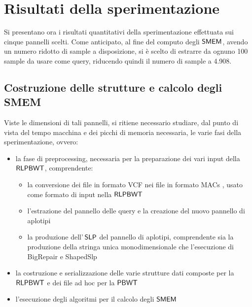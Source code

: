 \section{Risultati della sperimentazione}
Si presentano ora i risultati quantitativi della sperimentazione effettuata sui
cinque pannelli scelti. Come anticipato, al fine del computo degli $\mbox{\rm {\sf SMEM}}$,
avendo un numero 
ridotto di sample a disposizione, si è scelto di estrarre da ognuno 100 sample
da usare come query, riducendo quindi il numero di sample a 4.908.
\subsection{Costruzione delle strutture e calcolo degli SMEM}
Viste le dimensioni di tali pannelli, si ritiene necessario studiare, dal punto
di vista del tempo macchina e dei picchi di memoria necessaria, le varie fasi
della sperimentazione, ovvero:
\begin{itemize}
  \item la fase di preprocessing, necessaria per la preparazione dei
  vari input della $\mbox{\rm {\sf RLPBWT}}$, comprendente: 
  \begin{itemize}
    \item la conversione dei file in formato VCF nei file in formato MACs
    \cite{macs}, usato 
    come formato di input nella $\mbox{\rm {\sf RLPBWT}}$
    \item l'estrazione del pannello delle query e la creazione del nuovo
    pannello di aplotipi
    \item la produzione dell'$\,\mbox{\rm {\sf SLP}}$ del pannello di aplotipi, comprendente
    sia la produzione della stringa unica monodimensionale che l'esecuzione di
    BigRepair e ShapedSlp
  \end{itemize}
  \item la costruzione e serializzazione delle varie strutture dati composte per
  la $\mbox{\rm {\sf RLPBWT}}$ e dei file ad hoc per la $\mbox{\rm {\sf PBWT}}$
  \item l'esecuzione degli algoritmi per il calcolo degli $\mbox{\rm {\sf SMEM}}$
\end{itemize}
